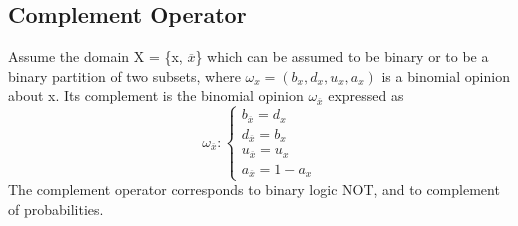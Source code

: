 \documentclass[UTF8]{article}
\begin{document}
\subsection{Complement Operator}
Assume the domain X = \{x, $\overline{x}$\} which can be
assumed to be binary or to be a binary partition of two subsets, where $\omega_x =
(b_x, d_x, u_x, a_x)$ is a binomial opinion about x. Its complement is the binomial opinion
$\omega_{\overline{x}}$ expressed as
$$
\omega_{\overline{x}}: 
\begin{cases}
    b_{\overline{x}} = d_x\\    
    d_{\overline{x}} = b_x\\
    u_{\overline{x}} = u_x\\
    a_{\overline{x}} = 1 - a_x
\end{cases}
$$
The complement operator corresponds to binary logic NOT, and to complement
of probabilities.
\end{document}
